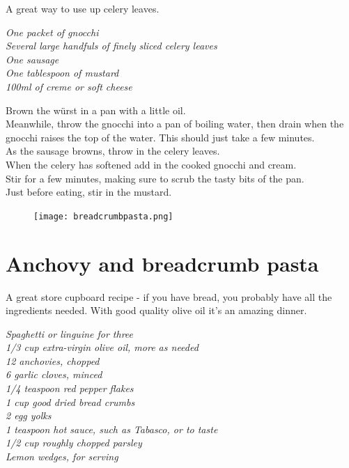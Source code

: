 \documentclass{tufte-book}
\begin{document}
A great way to use up celery leaves.

\smallskip
\emph{One packet of gnocchi
\\Several large handfuls of finely sliced celery leaves
\\One sausage
\\One tablespoon of mustard
\\100ml of creme or soft cheese}

\smallskip
Brown the w{\"u}rst in a pan with a little oil.
\\Meanwhile, throw the gnocchi into a pan of boiling water, then drain when the gnocchi raises the top of the water. This should just take a few minutes.
\\As the sausage browns, throw in the celery leaves.
\\When the celery has softened add in the cooked gnocchi and cream.
\\Stir for a few minutes, making sure to scrub the tasty bits of the pan.
\\Just before eating, stir in the mustard.


\newpage

\begin{figure}[h]
  \texttt{[image: breadcrumbpasta.png]}
\end{figure}

\section{Anchovy and breadcrumb pasta }

A great store cupboard recipe - if you have bread, you probably have all the ingredients needed. With good quality olive oil it's an amazing dinner.

\smallskip
\emph{Spaghetti or linguine for three
\\1/3 cup extra-virgin olive oil, more as needed
\\12 anchovies, chopped
\\6 garlic cloves, minced
\\1/4 teaspoon red pepper flakes
\\1 cup good dried bread crumbs
\\2 egg yolks
\\1 teaspoon hot sauce, such as Tabasco, or to taste
\\1/2 cup roughly chopped parsley
\\Lemon wedges, for serving}
\end{document}
